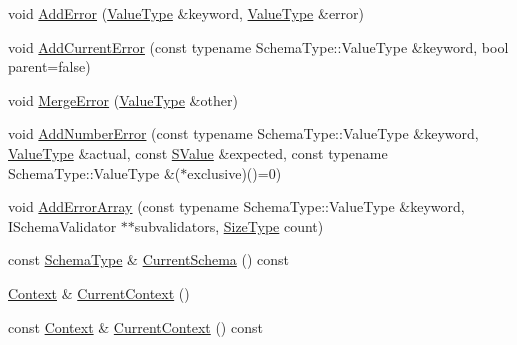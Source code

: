 \begin{DoxyCompactItemize}
\item 
void \mbox{\hyperlink{classrapidjson_1_1_generic_schema_validator_a506e23783887d1d95e5b0bd10729d1f2}{Add\+Error}} (\mbox{\hyperlink{classrapidjson_1_1_generic_schema_validator_a14216aea798d69f102987c1aae36e897}{Value\+Type}} \&keyword, \mbox{\hyperlink{classrapidjson_1_1_generic_schema_validator_a14216aea798d69f102987c1aae36e897}{Value\+Type}} \&error)
\item 
void \mbox{\hyperlink{classrapidjson_1_1_generic_schema_validator_ad10fb87a3b985c466c56fb495a7e264c}{Add\+Current\+Error}} (const typename Schema\+Type\+::\+Value\+Type \&keyword, bool parent=false)
\item 
void \mbox{\hyperlink{classrapidjson_1_1_generic_schema_validator_a71af0029789510f194a8580f240940ae}{Merge\+Error}} (\mbox{\hyperlink{classrapidjson_1_1_generic_schema_validator_a14216aea798d69f102987c1aae36e897}{Value\+Type}} \&other)
\item 
void \mbox{\hyperlink{classrapidjson_1_1_generic_schema_validator_a3acd93dcc3b489ed6cdd0db6b3688829}{Add\+Number\+Error}} (const typename Schema\+Type\+::\+Value\+Type \&keyword, \mbox{\hyperlink{classrapidjson_1_1_generic_schema_validator_a14216aea798d69f102987c1aae36e897}{Value\+Type}} \&actual, const \mbox{\hyperlink{classrapidjson_1_1_generic_schema_validator_a545e4e19bd9419d908bc21e1a7a6170d}{S\+Value}} \&expected, const typename Schema\+Type\+::\+Value\+Type \&($\ast$exclusive)()=0)
\item 
void \mbox{\hyperlink{classrapidjson_1_1_generic_schema_validator_a078592ec5c6f6b34420eead4cbc1c6c6}{Add\+Error\+Array}} (const typename Schema\+Type\+::\+Value\+Type \&keyword, I\+Schema\+Validator $\ast$$\ast$subvalidators, \mbox{\hyperlink{namespacerapidjson_a44eb33eaa523e36d466b1ced64b85c84}{Size\+Type}} count)
\item 
const \mbox{\hyperlink{classrapidjson_1_1_generic_schema_validator_a0619c9faf3014ef141d1c6d05ae04ddc}{Schema\+Type}} \& \mbox{\hyperlink{classrapidjson_1_1_generic_schema_validator_a4407789d931a65b7d49affd71808ace3}{Current\+Schema}} () const
\item 
\mbox{\hyperlink{classrapidjson_1_1_generic_schema_validator_ae76e4602ce2ef7070a57f0df5bb07e76}{Context}} \& \mbox{\hyperlink{classrapidjson_1_1_generic_schema_validator_acf4dc681a81ff065902bc6502c2e6790}{Current\+Context}} ()
\item 
const \mbox{\hyperlink{classrapidjson_1_1_generic_schema_validator_ae76e4602ce2ef7070a57f0df5bb07e76}{Context}} \& \mbox{\hyperlink{classrapidjson_1_1_generic_schema_validator_ae0d23b513919612b6dac3c5f0f8bb89f}{Current\+Context}} () const
\end{DoxyCompactItemize}
